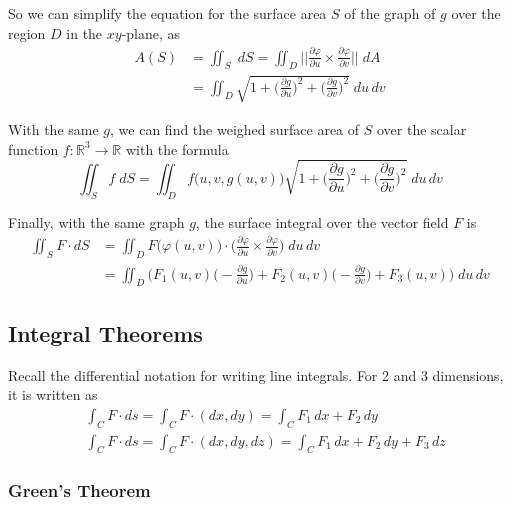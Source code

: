   So we can simplify the equation for the surface area $S$ of the graph of $g$ over the region $D$ in the $x y$-plane, as 
  \begin{align}
		A(S) & = \iint_S \; d S = \iint_D \bigg|\bigg|\frac{\partial \varphi}{\partial u} \times \frac{\partial \varphi}{\partial v} \bigg|\bigg| \; d A \\
		& = \iint_D \sqrt{1 + \Big(\frac{\partial g}{\partial u}\Big)^2 + \Big( \frac{\partial g}{\partial v}\Big)^2} \; d u \, d v
  \end{align}

  With the same $g$, we can find the weighed surface area of $S$ over the scalar function $f: \mathbb{R}^3 \longrightarrow \mathbb{R}$ with the formula
	\begin{equation}
  	\iint_S f \; d S = \iint_D f\big(u, v, g(u, v)\big) \sqrt{1 + \Big(\frac{\partial g}{\partial u}\Big)^2 + \Big( \frac{\partial g}{\partial v}\Big)^2} \; d u \, d v
	\end{equation}

  Finally, with the same graph $g$, the surface integral over the vector field $F$ is
  \begin{align}
		\iint_S F \cdot d S & = \iint_D F\big(\varphi(u, v)\big) \cdot \bigg( \frac{\partial \varphi}{\partial u} \times \frac{\partial \varphi}{\partial v}\bigg) \; d u \, d v \\
		& = \iint_D \bigg( F_1(u, v) \Big(- \frac{\partial g}{\partial u}\Big) + F_2 (u, v) \Big( - \frac{\partial g}{\partial v} \Big) + F_3 (u, v) \bigg) \; d u \, d v
  \end{align}

\subsection{Integral Theorems}

  Recall the differential notation for writing line integrals. For 2 and 3 dimensions, it is written as
  \begin{align}
		& \int_C F \cdot d s = \int_C F \cdot (d x, d y) = \int_C F_1 \, d x + F_2 \, d y \\
		& \int_C F \cdot d s = \int_C F \cdot (d x, d y, d z) = \int_C F_1 \, d x + F_2 \, d y + F_3 \, d z 
  \end{align}

\subsubsection{Green's Theorem}

